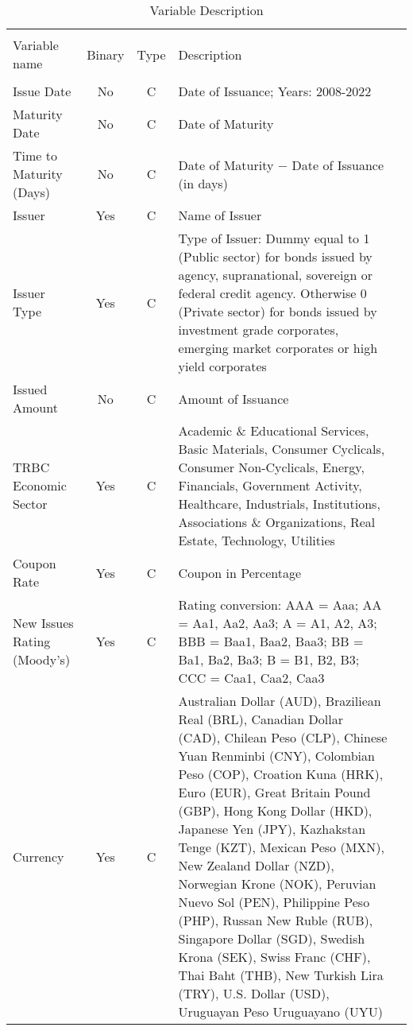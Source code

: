\begin{table}[!h] \centering 
  \caption{Variable Description} 
  \label{vardesc}
  \begin{adjustbox}{width=\columnwidth,center}
\begin{tabular}{@{\extracolsep{5pt}}lccp{10cm}p{3cm}} 
\\[-1.8ex]\hline 
\hline \\[-1.8ex] 
Variable name & \multicolumn{1}{c}{Binary} & \multicolumn{1}{c}{Type} & Description \\ 
\hline \\[-1.8ex] 
Issue Date & No & C & Date of Issuance; Years: 2008-2022 \\
Maturity Date & No & C &  Date of Maturity\\
Time to Maturity (Days) & No & C & Date of Maturity $-$ Date of Issuance (in days)\\
Issuer & Yes & C & Name of Issuer \\
Issuer Type & Yes & C & Type of Issuer: Dummy equal to 1 (Public sector) for bonds issued by agency, supranational, sovereign or federal credit agency. Otherwise 0 (Private sector) for bonds issued by investment grade corporates, emerging market corporates or high yield corporates \\
Issued Amount & No & C & Amount of Issuance\\
TRBC Economic Sector & Yes & C & Academic \& Educational Services, Basic Materials, Consumer Cyclicals, Consumer Non-Cyclicals, Energy, Financials, Government Activity, Healthcare, Industrials, Institutions, Associations \& Organizations, Real Estate, Technology, Utilities \\
Coupon Rate & Yes & C & Coupon in Percentage\\
New Issues Rating (Moody's) & Yes & C & Rating conversion: AAA = Aaa; AA = Aa1, Aa2, Aa3; A = A1, A2, A3; BBB = Baa1, Baa2, Baa3; BB = Ba1, Ba2, Ba3; B = B1, B2, B3; CCC = Caa1, Caa2, Caa3\\
Currency & Yes & C & Australian Dollar (AUD), Braziliean Real (BRL), Canadian Dollar (CAD), Chilean Peso (CLP), Chinese Yuan Renminbi (CNY), Colombian Peso (COP), Croation Kuna (HRK), Euro (EUR), Great Britain Pound (GBP), Hong Kong Dollar (HKD), Japanese Yen (JPY), Kazhakstan Tenge (KZT), Mexican Peso (MXN), New Zealand Dollar (NZD), Norwegian Krone (NOK), Peruvian Nuevo Sol (PEN), Philippine Peso (PHP), Russan New Ruble (RUB), Singapore Dollar (SGD), Swedish Krona (SEK), Swiss Franc (CHF), Thai Baht (THB), New Turkish Lira (TRY), U.S. Dollar (USD), Uruguayan Peso Uruguayano (UYU)\\

\end{tabular}
\end{adjustbox}
\end{table}
